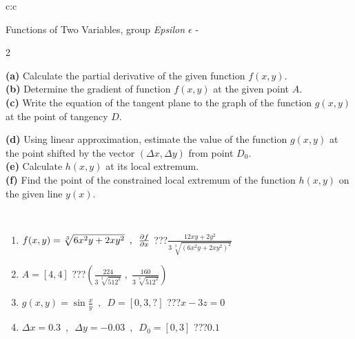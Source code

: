 \documentclass[10pt]{report}
\begin{document}
\begin{tabular}{c:c}
\begin{minipage}[c][104.5mm][t]{0.5\linewidth}
\begin{center}
\vspace{7mm}
{\huge \LARGE Functions of Two Variables, group \textit{Epsilon $\epsilon$} -}\\[5mm]
\begin{minipage}{0.95\linewidth}
\begin{center}
{\small \begin{multicols}{2} \raggedright
\textbf{(a)} Calculate the partial derivative of the given function \(f(x,y)\). \\[1mm]
\textbf{(b)} Determine the gradient of function \(f(x,y)\) at the given point \(A\). \\[1mm]
\textbf{(c)} Write the equation of the tangent plane to the graph of the function \(g(x,y)\) at the point of tangency \(D\). \par \columnbreak
\textbf{(d)} Using linear approximation, estimate the value of the function \(g(x,y)\) at the point shifted by the vector \((\Delta x, \Delta y)\) from point \(D_0\). \\[1mm]
\textbf{(e)} Calculate \(h(x,y)\) at its local extremum. \\[1mm]
\textbf{(f)} Find the point of the constrained local extremum of the function \(h(x,y)\) on the given line \(y(x)\). \\[1mm]
\end{multicols}
}
\end{center}
\end{minipage}
\\[4mm]
\begin{minipage}{0.79\linewidth}
\begin{center}
\begin{varwidth}{\linewidth}
\begin{enumerate}
\normalsizerr
\item $f(x,y) = \sqrt[3]{6x^2y + 2xy^2}\enspace , \enspace \pdv{f}{x}$\quad \dotfill\; ???\;\dotfill \quad $\frac{12xy+2y^2}{3\,\sqrt[3]{(6x^2y+2xy^2)^{2}}}$
\item $A = [4, 4]$\quad \dotfill\; ???\;\dotfill \quad $\left( \frac{224}{3\,\sqrt[3]{512^2}} \;,\; \frac{160}{3\,\sqrt[3]{512^2}} \right)$
\item $g(x,y) = \sin\frac{x}{y} \enspace , \enspace D = [0, 3, ?]$\quad \dotfill\; ???\;\dotfill \quad $x-3z=0$
\item $\Delta x = {0.3} \enspace,\enspace \Delta y = {-0.03} \enspace,\enspace D_0 = [0,3]$\quad \dotfill\; ???\;\dotfill \quad $0.1$

\end{enumerate}
\end{varwidth}
\end{center}
\end{minipage}
\end{center}
\end{minipage}
\end{tabular}
\end{document}
